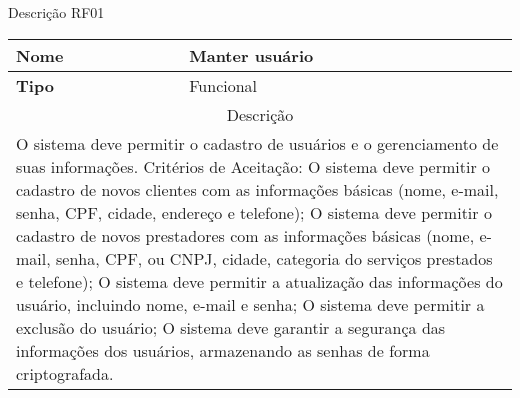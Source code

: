 \begin{quadro}[htb]
	\centering
	\caption{\label{Formatação do texto.}Descrição RF01}	
	\begin{tabular}{|l|p{11cm}|}
		\hline
		\textbf{Nome}    & Manter usuário\\ \hline
		\textbf{Tipo}    & Funcional\\ \hline
		\multicolumn{2}{|c|}{Descrição}\\ \hline
		\multicolumn{2}{|p{12cm}|}{
			O sistema deve permitir o cadastro de usuários e o gerenciamento de suas informações. \newline
			\newline Critérios de Aceitação: \newline
			O sistema deve permitir o cadastro de novos clientes com as informações básicas (nome, e-mail, senha, CPF, cidade, endereço e telefone); \newline
			\newline O sistema deve permitir o cadastro de novos prestadores com as informações básicas (nome, e-mail, senha, CPF, ou CNPJ, cidade, categoria do serviços prestados e telefone); \newline
			\newline O sistema deve permitir a atualização das informações do usuário, incluindo nome, e-mail e senha; \newline
			\newline O sistema deve permitir a exclusão do usuário; \newline
			O sistema deve garantir a segurança das informações dos usuários, armazenando as senhas de forma criptografada.
			} \\ \hline
	\end{tabular}
\end{quadro}

